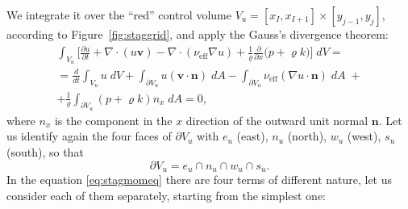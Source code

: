We integrate it over the ``red'' control volume $V_u=[x_I, 
x_{I+1}]\times[y_{j-1},y_j]$, 
according to Figure~\ref{fig:staggrid}, and apply the Gauss's divergence 
theorem:
\begin{multline} \label{eq:stagmomeq}
\int_{V_u} \bigg[ \frac{\partial u}{\partial t} + \nabla \cdot ( u \mathbf{v} ) 
- \nabla \cdot (\nu_\text{eff} \nabla u) + \frac{1}{\varrho} 
\frac{\partial}{\partial x} \big( p + \varrho k \big) \bigg ]\; dV 
=\\
=\frac{d}{dt} \int_{V_u} u\; dV + \int_{\partial V_u} u (\mathbf{v} \cdot 
\mathbf{n}) \; dA - \int_{\partial V_u} \nu_\text{eff} (\nabla u \cdot 
\mathbf{n}) \; dA \; + \\
+\frac{1}{\varrho}\int_{\partial V_u} (p + \varrho k) n_x \; dA = 0,
\end{multline}
where $n_x$ is the component in the $x$ direction of the outward unit 
normal $\mathbf{n}$. Let us identify again the four faces of $\partial V_u$ 
with $e_u$ (east), $n_u$ (north), $w_u$ (west), $s_u$ (south), so that
\begin{equation}
	\partial V_u = e_u \cap n_u \cap w_u \cap s_u.
\end{equation}
In the equation \eqref{eq:stagmomeq} there are four terms of different nature, 
let us consider each of them separately, starting from the simplest one:
